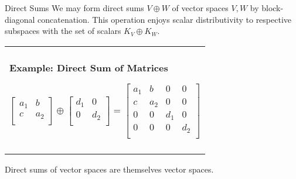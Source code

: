 \documentclass[11pt]{beamer}
\newenvironment{boxed2}
    {\begin{center}
    \begin{tabular}{|p{0.95\textwidth}|}
    \hline\\
    }
    { 
    \\\\\hline
    \end{tabular} 
    \end{center}
    }
\begin{document}
\begin{frame}{Direct Sums}
We may form direct sums $V\oplus W$ of vector spaces $V,W$ by block-diagonal concatenation. This operation enjoys scalar distributivity to respective subspaces with the set of scalars $K_V\oplus K_W$.

\begin{boxed2}
	
	\vspace{-.57cm}
	
	\textbf{Example: Direct Sum of Matrices}
	
	
	\vspace{-.12cm}
	
	$$
		\begin{bmatrix}
			a_1&b\\
			c&a_2\\
		\end{bmatrix}
		\oplus 
		\begin{bmatrix}
			d_1&0\\
			0&d_2\\
		\end{bmatrix}
		=\begin{bmatrix}
			a_1&b&0&0\\
			c&a_2&0&0\\
			0&0 &d_1 &0\\
			0&0&0&d_2\\
		\end{bmatrix}
	$$

\vspace{-.1cm}

\end{boxed2}
	
Direct sums of vector spaces are themselves vector spaces.
\end{frame}
\end{document}

